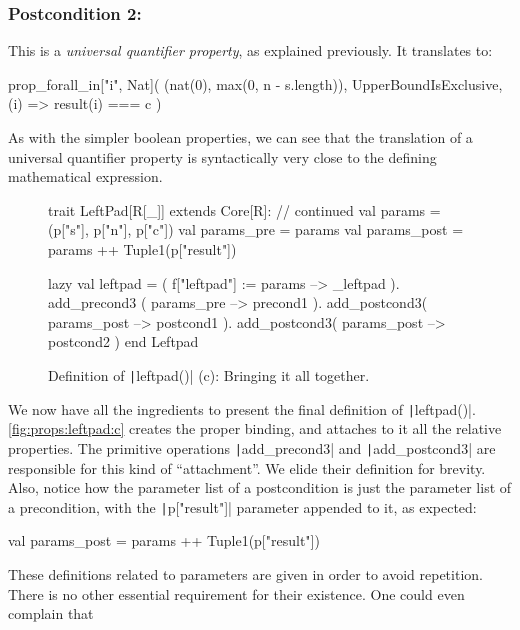 \documentclass[11pt]{article}
\renewcommand{\vref}[1]{\autoref{#1} \vpageref{#1}}{}
\newcommand{\ScalaI}[1]{\texttt|#1|}
\begin{document}
\subsubsection*{Postcondition 2: \leftpadpostb}

\noindent This is a \textit{universal quantifier property}, as explained previously. It translates to:

\begin{ScalaBlockSimple}
prop_forall_in["i", Nat](
  (nat(0), max(0, n - s.length)),
  UpperBoundIsExclusive,
  (i) => result(i) === c
)
\end{ScalaBlockSimple}

\noindent As with the simpler boolean properties, we can see that the 
translation of a universal quantifier property is syntactically very close to 
the defining mathematical expression.

\begin{figure}[tb]
\begin{ScalaBlock}
trait LeftPad[R[_]] extends Core[R]:
  // continued
  val params      = (p["s"], p["n"], p["c"])
  val params_pre  = params
  val params_post = params ++ Tuple1(p["result"])
  
  lazy val leftpad =
      ( f["leftpad"] := params --> _leftpad ).
        add_precond3 ( params_pre  --> precond1 ).
        add_postcond3( params_post --> postcond1 ).
        add_postcond3( params_post --> postcond2 )
end Leftpad
\end{ScalaBlock}
\caption{Definition of \ScalaI{leftpad()} (c): Bringing it all together.}
\label{fig:props:leftpad:c}
\hrulefill
\end{figure}

We now have all the ingredients to present the final definition of 
\ScalaI{leftpad()}. \vref{fig:props:leftpad:c} creates the proper binding, 
and attaches to it all the relative properties. The primitive operations 
\ScalaI{add_precond3} and \ScalaI{add_postcond3} are responsible for this 
kind of ``attachment''. We elide their definition for brevity. Also, notice 
how the parameter list of a postcondition is just the parameter list of a 
precondition, with the \ScalaI{p["result"]} parameter appended to it, as 
expected:

\begin{ScalaBlockSimple}
val params_post = params ++ Tuple1(p["result"])
\end{ScalaBlockSimple}

\noindent These definitions related to parameters are given in order to avoid 
repetition. There is no other essential requirement for their existence. One 
could even complain that
\end{document}
